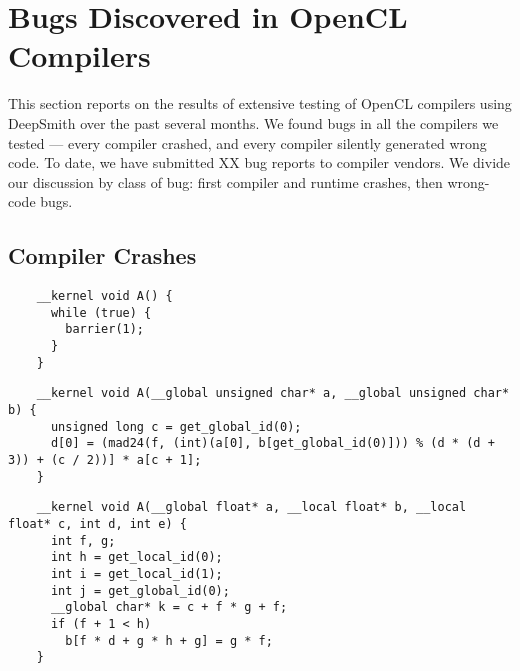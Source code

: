 \section{Bugs Discovered in OpenCL Compilers}

This section reports on the results of extensive testing of OpenCL compilers using DeepSmith over the past several months. We found bugs in all the compilers we tested --- every compiler crashed, and every compiler silently generated wrong code. To date, we have submitted XX bug reports to compiler vendors. We divide our discussion by class of bug: first compiler and runtime crashes, then wrong-code bugs.

\subsection{Compiler Crashes}

\newsavebox{\IntelVectorizerSegfault}
\begin{lrbox}{\IntelVectorizerSegfault}
  \hspace{1.5em}
  \begin{lstlisting}
    __kernel void A() {
      while (true) {
        barrier(1);
      }
    }
  \end{lstlisting}
\end{lrbox}


\newsavebox{\OclgrindSemaAssertion}
\begin{lrbox}{\OclgrindSemaAssertion}
  \hspace{1.5em}
  \begin{lstlisting}
    __kernel void A(__global unsigned char* a, __global unsigned char* b) {
      unsigned long c = get_global_id(0);
      d[0] = (mad24(f, (int)(a[0], b[get_global_id(0)])) % (d * (d + 3)) + (c / 2))] * a[c + 1];
    }
  \end{lstlisting}
\end{lrbox}

\newsavebox{\NvidiaCompileSegfault}
\begin{lrbox}{\NvidiaCompileSegfault}
  \hspace{1.5em}
  \begin{lstlisting}
    __kernel void A(__global float* a, __local float* b, __local float* c, int d, int e) {
      int f, g;
      int h = get_local_id(0);
      int i = get_local_id(1);
      int j = get_global_id(0);
      __global char* k = c + f * g + f;
      if (f + 1 < h)
        b[f * d + g * h + g] = g * f;
    }
  \end{lstlisting}
\end{lrbox}

